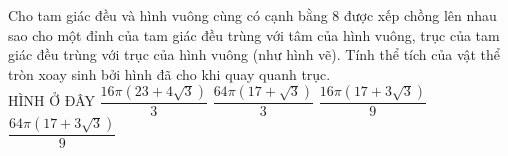 \begin{ex}
	Cho tam giác đều và hình vuông cùng có cạnh bằng 8 được xếp chồng lên nhau sao cho một đỉnh của tam giác đều trùng với tâm của hình vuông, trục của tam giác đều trùng với trục của hình vuông (như hình vẽ). Tính thể tích của vật thể tròn xoay sinh bởi hình đã cho khi quay quanh trục.\\
	{\color{red}HÌNH Ở ĐÂY}
	\choice
	{$\dfrac{16\pi\left(23+4\sqrt{3}\right)}{3}$}
	{$\dfrac{64\pi\left(17+\sqrt{3}\right)}{3}$}
	{$\dfrac{16\pi\left(17+3\sqrt{3}\right)}{9}$}
	{\True $\dfrac{64\pi\left(17+3\sqrt{3}\right)}{9}$}
\end{ex}
